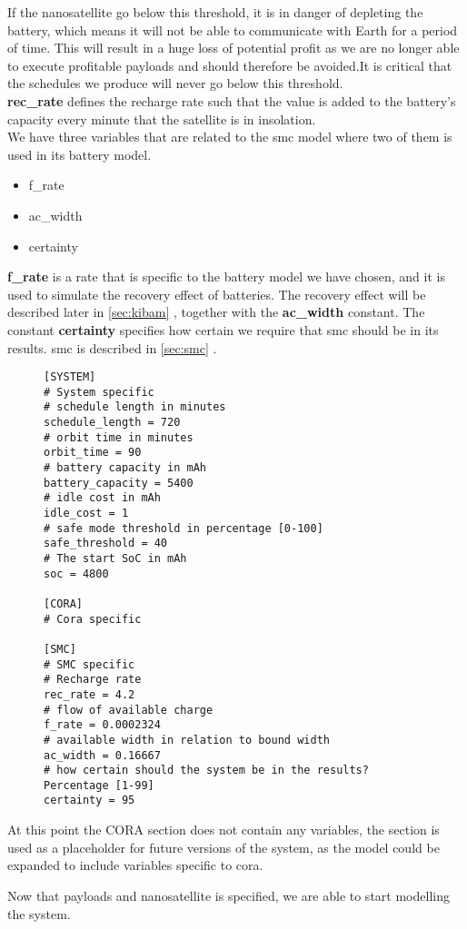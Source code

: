 If the nanosatellite go below this threshold, it is in danger of depleting the battery, which means it will not be able to communicate with Earth for a period of time.
This will result in a huge loss of potential profit as we are no longer able to execute profitable payloads and should therefore be avoided.It is critical that the schedules we produce will never go below this threshold.\\
\textbf{rec\_rate}  defines the recharge rate such that the value is added to the battery's capacity every minute that the satellite is in insolation.\\
We have three variables that are related to the \gls{smc} model where two of them is used in its battery model.\\
\begin{itemize}
	\item f\_rate
	\item ac\_width
	\item certainty
\end{itemize}
\textbf{f\_rate} is a rate that is specific to the battery model we have chosen, and it is used to simulate the recovery effect of batteries. The recovery effect will be described later in \cref{sec:kibam} , together with the \textbf{ac\_width} constant.
The constant \textbf{certainty} specifies how certain we require that \gls{smc} should be in its results. \gls{smc} is described in \cref{sec:smc} .
\begin{figure}[H]
\begin{lstlisting}[caption={Example of how the environment can be defined}, label=lst:ini, language=text]
[SYSTEM]
# System specific
# schedule length in minutes
schedule_length = 720
# orbit time in minutes
orbit_time = 90
# battery capacity in mAh
battery_capacity = 5400
# idle cost in mAh
idle_cost = 1
# safe mode threshold in percentage [0-100]
safe_threshold = 40
# The start SoC in mAh
soc = 4800

[CORA]
# Cora specific

[SMC]
# SMC specific
# Recharge rate
rec_rate = 4.2
# flow of available charge
f_rate = 0.0002324
# available width in relation to bound width
ac_width = 0.16667
# how certain should the system be in the results? Percentage [1-99]
certainty = 95
\end{lstlisting}
\end{figure}
At this point the CORA section does not contain any variables, the section is used as a placeholder for future versions of the system, as the model could be expanded to include variables specific to \gls{cora}.

Now that payloads and nanosatellite is specified, we are able to start modelling the system.
